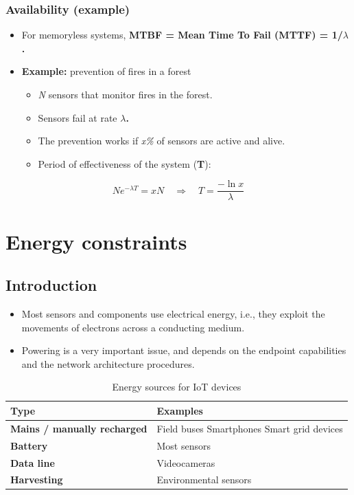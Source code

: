 \subsubsection{Availability (example)}
\begin{itemize}
    \item For memoryless systems, \textbf{MTBF = Mean Time To Fail (MTTF) = 1/$\lambda$.}
    
    \item \textbf{Example:} prevention of fires in a forest
    \begin{itemize}
        \item \textit{N} sensors that monitor fires in the forest.
        \item Sensors fail at rate \textbf{$\lambda$.}
        \item The prevention works if \textit{x\%} of sensors are active and alive.
        \item Period of effectiveness of the system (\textbf{T}):
    \end{itemize}
\end{itemize}

$$
N e^{-\lambda T} = xN \quad \Rightarrow \quad T = \frac{-\ln x}{\lambda}
$$

\section{Energy constraints}

\subsection{Introduction}

\begin{itemize}
    \item Most sensors and components use electrical energy, i.e., they exploit the movements of electrons across a conducting medium.
    \item Powering is a very important issue, and depends on the endpoint capabilities and the network architecture procedures.
\end{itemize}

\begin{table}[h]
\centering
\begin{tabular}{|l|l|}
\hline
\textbf{Type} & \textbf{Examples} \\
\hline
\textbf{Mains / manually recharged} & Field buses Smartphones Smart grid devices \\
\hline
\textbf{Battery} & Most sensors \\
\hline
\textbf{Data line} & Videocameras \\
\hline
\textbf{Harvesting} & Environmental sensors \\
\hline
\end{tabular}
\caption{Energy sources for IoT devices}
\end{table}

